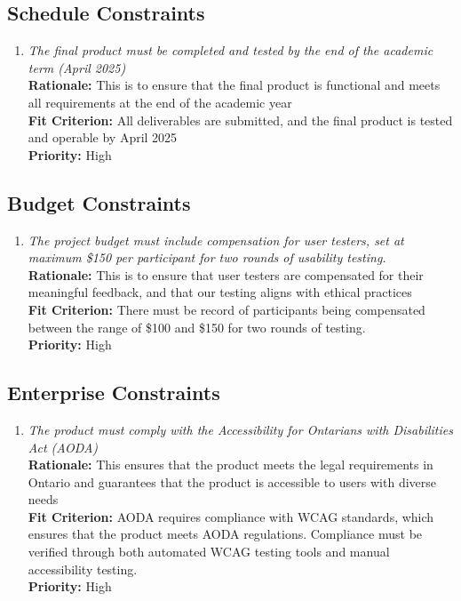 \documentclass[12pt]{article}
\begin{document}
\subsection{Schedule Constraints}
\begin{enumerate}[label=MD-SC \arabic*., wide=0pt, leftmargin=*]
  \item \emph{The final product must be completed and tested by the end of the academic term (April 2025)}\\[2mm]
    {\bf Rationale:} This is to ensure that the final product is functional and meets all requirements
    at the end of the academic year\\
    {\bf Fit Criterion:} All deliverables are submitted, and the final product is tested and operable by April 2025 \\
    {\bf Priority:} High
\end{enumerate}
\subsection{Budget Constraints}
\begin{enumerate}[label=MD-BC \arabic*., wide=0pt, leftmargin=*]
  \item \emph{The project budget must include compensation for user testers, set at maximum \$150 per participant for two rounds of usability testing.}\\[2mm]
    {\bf Rationale:} This is to ensure that user testers are compensated for their meaningful feedback, 
    and that our testing aligns with ethical practices\\
    {\bf Fit Criterion:} There must be record of participants being compensated between the range of \$100 and \$150 for
    two rounds of testing. \\
    {\bf Priority:} High
\end{enumerate}
\subsection{Enterprise Constraints}
\begin{enumerate}[label=MD-EC \arabic*., wide=0pt, leftmargin=*]
  \item \emph{The product must comply with the Accessibility for Ontarians with Disabilities Act (AODA)}\\[2mm]
    {\bf Rationale:} This ensures that the product meets the legal requirements in Ontario and guarantees that 
    the product is accessible to users with diverse needs\\
    {\bf Fit Criterion:} AODA requires compliance with WCAG standards, which ensures that the product meets AODA regulations. 
    Compliance must be verified through both automated WCAG testing tools and manual accessibility testing.\\
    {\bf Priority:} High
\end{enumerate}
\end{document}
